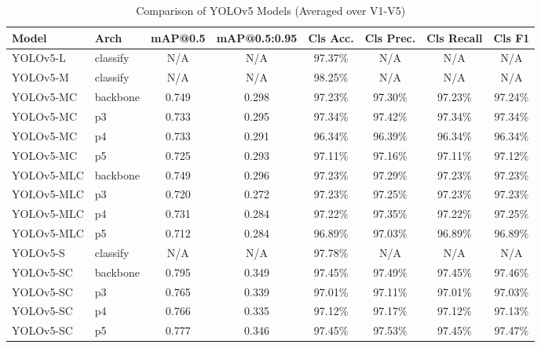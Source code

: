\begin{table}[htbp]
\centering
\caption{Comparison of YOLOv5 Models (Averaged over V1-V5)}
\label{tab:model_comparison}
\begin{tabular}{l|l|cc|cccc}
\hline
Model & Arch & mAP@0.5 & mAP@0.5:0.95 & Cls Acc. & Cls Prec. & Cls Recall & Cls F1 \\
\hline
YOLOv5-L & classify & N/A & N/A & 97.37\% & N/A & N/A & N/A \\
YOLOv5-M & classify & N/A & N/A & 98.25\% & N/A & N/A & N/A \\
YOLOv5-MC & backbone & 0.749 & 0.298 & 97.23\% & 97.30\% & 97.23\% & 97.24\% \\
YOLOv5-MC & p3 & 0.733 & 0.295 & 97.34\% & 97.42\% & 97.34\% & 97.34\% \\
YOLOv5-MC & p4 & 0.733 & 0.291 & 96.34\% & 96.39\% & 96.34\% & 96.34\% \\
YOLOv5-MC & p5 & 0.725 & 0.293 & 97.11\% & 97.16\% & 97.11\% & 97.12\% \\
YOLOv5-MLC & backbone & 0.749 & 0.296 & 97.23\% & 97.29\% & 97.23\% & 97.23\% \\
YOLOv5-MLC & p3 & 0.720 & 0.272 & 97.23\% & 97.25\% & 97.23\% & 97.23\% \\
YOLOv5-MLC & p4 & 0.731 & 0.284 & 97.22\% & 97.35\% & 97.22\% & 97.25\% \\
YOLOv5-MLC & p5 & 0.712 & 0.284 & 96.89\% & 97.03\% & 96.89\% & 96.89\% \\
YOLOv5-S & classify & N/A & N/A & 97.78\% & N/A & N/A & N/A \\
YOLOv5-SC & backbone & 0.795 & 0.349 & 97.45\% & 97.49\% & 97.45\% & 97.46\% \\
YOLOv5-SC & p3 & 0.765 & 0.339 & 97.01\% & 97.11\% & 97.01\% & 97.03\% \\
YOLOv5-SC & p4 & 0.766 & 0.335 & 97.12\% & 97.17\% & 97.12\% & 97.13\% \\
YOLOv5-SC & p5 & 0.777 & 0.346 & 97.45\% & 97.53\% & 97.45\% & 97.47\% \\
\hline
\end{tabular}
\end{table}